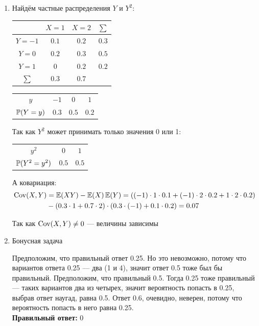\begin{enumerate}
\item Найдём частные распределения $Y$ и $Y^2$:
\begin{center}
\begin{tabular}{cccc}
\toprule
 & $X=1$ & $X=2$ & $\sum$ \\ \midrule
$Y=-1$ & $0.1$ & $0.2$ & $0.3$ \\
$Y=0$ & $0.2$ & $0.3$ & $0.5$ \\
$Y=1$ & $0$ & $0.2$ & $0.2$ \\
$\sum$ & $0.3$ & $0.7$ & \\ \bottomrule
\end{tabular}
\end{center}

\begin{center}
\begin{tabular}{@{}cccc@{}}
\toprule
$y$         & $-1$             & $0$      & $1$         \\
$\P(Y=y)$ & $0.3$ & $0.5$  & $0.2$\\ \bottomrule
\end{tabular}
\end{center}

Так как $Y^2$ может принимать только значения 0 или 1:

\begin{center}
\begin{tabular}{@{}ccc@{}}
\toprule
$y^2$         & $0$             & $1$               \\
$\P(Y^2 = y^2)$ & $0.5$ & $0.5$ \\ \bottomrule
\end{tabular}
\end{center}
А ковариация:
\begin{align*}
\Cov(X, Y) &= \E(XY) - \E(X)\E(Y) =
((-1)\cdot 1\cdot0.1 + (-1)\cdot2 \cdot 0.2 + 1\cdot2\cdot 0.2) \\
&- (0.3\cdot1 + 0.7 \cdot 2)\cdot(0.3\cdot(-1) + 0.1\cdot 0.2) = 0.07
\end{align*}

Так как $\Cov(X, Y) \ne 0$ — величины зависимы

\item Бонусная задача

Предположим, что правильный ответ 0.25. Но это невозможно, потому что вариантов ответа 0.25 — два (1 и 4), значит ответ 0.5 тоже был бы правильный. Предположим, что правильный 0.5. Тогда 0.25 тоже правильный — таких вариантов два из четырех, значит вероятность попасть в 0.25, выбрав ответ наугад, равна 0.5. Ответ 0.6, очевидно, неверен, потому что вероятность попасть в него равна 0.25. \\
\textbf{Правильный ответ:} 0
\end{enumerate}



